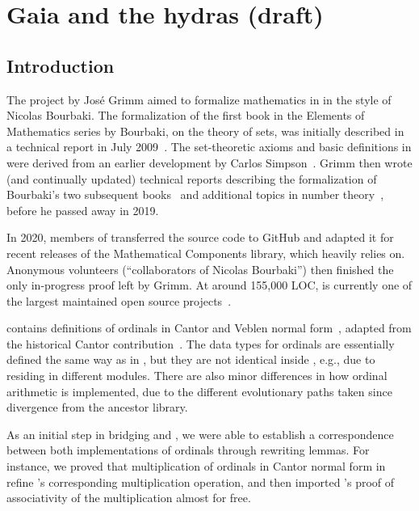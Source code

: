 \chapter{Gaia and the hydras (draft)}

\section{Introduction}
The \gaia project by Jos\'e Grimm aimed to formalize mathematics in \coq in
the style of Nicolas Bourbaki. The formalization of the first book in the
Elements of Mathematics series by Bourbaki, on the theory of sets, was
initially described in a technical report in July 2009~\cite{Grimm2009a}.
The set-theoretic axioms and basic definitions in \gaia were derived
from an earlier development by Carlos Simpson~\cite{Simpson2004,CatsZFCContrib}.
Grimm then wrote (and continually updated) technical reports describing the
formalization of Bourbaki's two subsequent books~\cite{Grimm2009b,Grimm2016}
and additional topics in number theory~\cite{grimm:hal-00911710,Grimm2014},
before he passed away in 2019.

In 2020, members of \community transferred the \gaia source code to
GitHub and adapted it for recent releases of the Mathematical Components
library, which \gaia heavily relies on.
Anonymous volunteers (``collaborators of Nicolas Bourbaki'') then finished
the only in-progress proof left by Grimm. At around 155,000 LOC, \gaia is currently one of the largest maintained open source \coq projects~\cite{Gaia}.

\gaia contains definitions of ordinals in Cantor and Veblen normal form~\cite{grimm:hal-00911710}, adapted from the historical Cantor contribution~\cite{CantorContrib}. The data types for ordinals are essentially defined the same way as in \Hydras, but they are not identical inside \coq, e.g., due to residing in different modules. There are also minor differences in how ordinal arithmetic is implemented, due to the different evolutionary paths taken since divergence from the ancestor library.

As an initial step in bridging \gaia and \Hydras, we were able to establish a
correspondence between both implementations of ordinals through rewriting
lemmas. For instance, we proved that multiplication of ordinals in Cantor
normal form in \Hydras refine \gaia's corresponding multiplication operation,
and then imported \gaia's proof of associativity of the multiplication
almost for free.

